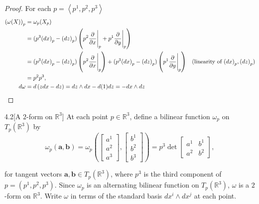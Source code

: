 \begin{proof}
	For each \( p = \left\langle{p^{1}, p^{2}, p^{3}}\right\rangle \)
	\begingroup
	\allowdisplaybreaks%
	\begin{align*}
		{(\omega(X))}_{p} & = \omega_{p}(X_{p})                                                                                                                                                                                                                            \\
		                  & = (p^{3}{(dx)}_{p} - {(dz)}_{p})\left(p^{2}\frac{\partial}{\partial x}\Bigg{\vert}_{p} + p^{1}\frac{\partial}{\partial y}\Bigg{\vert}_{p}\right)                                                                                               \\
		                  & = (p^{3}{(dx)}_{p} - {(dz)}_{p})\left(p^{2}\frac{\partial}{\partial x}\Bigg{\vert}_{p}\right) + (p^{3}{(dx)}_{p} - {(dz)}_{p})\left(p^{1}\frac{\partial}{\partial y}\Bigg{\vert}_{p}\right) & \text{(linearity of \({(dx)}_{p}, {(dz)}_{p}\))} \\
		                  & = p^{2}p^{3},                                                                                                                                                                                                                                  \\
		d\omega           & = d\left( zdx - dz \right) = dz\wedge dx - d(1)dz = -dx\wedge dz
	\end{align*}
	\endgroup
\end{proof}

\begin{problem}{4.2}[A \(2\)-form on \(\mathbb{R}^{3}\)]
At each point \(p\in\mathbb{R}^{3}\), define a bilinear function \(\omega_{p}\) on \( T_{p}(\mathbb{R}^{3}) \) by
\[
	\omega_{p}(\mathbf{a}, \mathbf{b}) = \omega_{p}\left(\begin{bmatrix}a^{1} \\ a^{2} \\ a^{3}\end{bmatrix}, \begin{bmatrix}b^{1} \\ b^{2} \\ b^{3}\end{bmatrix}\right) = p^{3}\det\begin{bmatrix}a^{1} & b^{1} \\ a^{2} & b^{2}\end{bmatrix},
\]

for tangent vectors \( \mathbf{a}, \mathbf{b} \in T_{p}(\mathbb{R}^{3}) \), where \(p^{3}\) is the third component of \(p = (p^{1}, p^{2}, p^{3})\). Since \(\omega_{p}\) is an alternating bilinear function on \(T_{p}(\mathbb{R}^{3})\), \(\omega\) is a \(2\)-form on \(\mathbb{R}^{3}\). Write \(\omega\) in terms of the standard basis \( dx^{i} \wedge dx^{j} \) at each point.
\end{problem}


